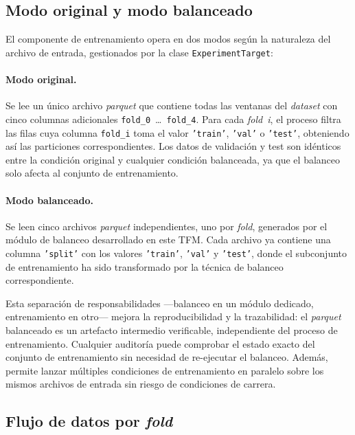 \subsection{Modo original y modo balanceado}
\label{subsec:modos_pipeline}
El componente de entrenamiento opera en dos modos según la naturaleza del archivo de entrada, gestionados por la clase \texttt{ExperimentTarget}:

\paragraph{Modo original.} Se lee un único archivo \textit{parquet} que contiene todas las ventanas del \textit{dataset} con cinco columnas adicionales \texttt{fold\_0}~\ldots~\texttt{fold\_4}. Para cada \textit{fold~i}, el proceso filtra las filas cuya columna \texttt{fold\_i} toma el valor \texttt{'train'}, \texttt{'val'} o \texttt{'test'}, obteniendo así las particiones correspondientes. Los datos de validación y test son idénticos entre la condición original y cualquier condición balanceada, ya que el balanceo solo afecta al conjunto de entrenamiento.

\paragraph{Modo balanceado.} Se leen cinco archivos \textit{parquet} independientes, uno por \textit{fold}, generados por el módulo de balanceo desarrollado en este TFM. Cada archivo ya contiene una columna \texttt{'split'} con los valores \texttt{'train'}, \texttt{'val'} y \texttt{'test'}, donde el subconjunto de entrenamiento ha sido transformado por la técnica de balanceo correspondiente.

Esta separación de responsabilidades ---balanceo en un módulo dedicado, entrenamiento en otro--- mejora la reproducibilidad y la trazabilidad: el \textit{parquet} balanceado es un artefacto intermedio verificable, independiente del proceso de entrenamiento. Cualquier auditoría puede comprobar el estado exacto del conjunto de entrenamiento sin necesidad de re-ejecutar el balanceo. Además, permite lanzar múltiples condiciones de entrenamiento en paralelo sobre los mismos archivos de entrada sin riesgo de condiciones de carrera.
\subsection{Flujo de datos por \emph{fold}}
\label{subsec:flujo_datos_fold}

